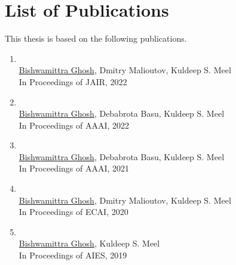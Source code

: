 
\section*{List of Publications}
This thesis is based on the following publications.

\begin{enumerate}
	\item \href{https://arxiv.org/pdf/2205.06936.pdf}{} \\
	\underline{Bishwamittra Ghosh}, Dmitry Malioutov, Kuldeep S. Meel\\
	In Proceedings of JAIR, 2022
	
	\item \href{https://arxiv.org/pdf/2109.09447.pdf}{} \\
	\underline{Bishwamittra Ghosh}, Debabrota Basu, Kuldeep S. Meel\\
	In Proceedings of AAAI, 2022
		
	\item \href{https://arxiv.org/pdf/2009.06516.pdf}{} \\
	\underline{Bishwamittra Ghosh}, Debabrota Basu, Kuldeep S. Meel\\
	In Proceedings of AAAI, 2021
	
	
	\item \href{https://bishwamittra.github.io/publication/ecai_2020/paper.pdf}{} \\
	\underline{Bishwamittra Ghosh}, Dmitry Malioutov, Kuldeep S. Meel\\
	In Proceedings of ECAI, 2020
	
	\item \href{https://bishwamittra.github.io/publication/imli-ghosh.pdf}{}\\
	\underline{Bishwamittra Ghosh}, Kuldeep S. Meel\\
	In Proceedings of AIES, 2019
	
	
\end{enumerate}
\clearpage
